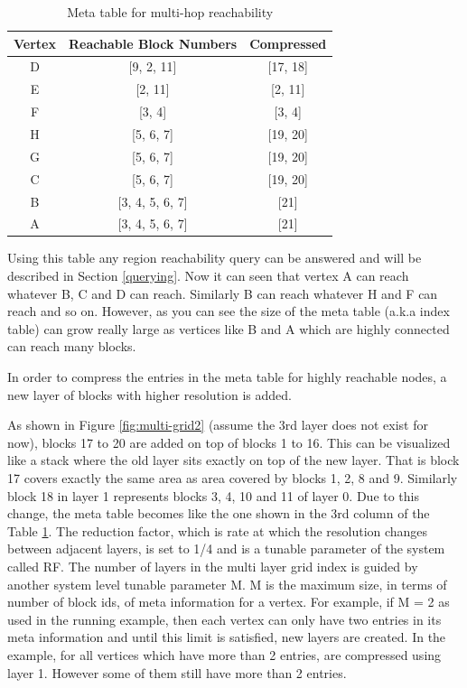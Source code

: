 \begin{table}[h]
	\caption{Meta table for multi-hop reachability}
	\small
	\label{tab:multi-hop-meta}
	\begin{center}
		\renewcommand{\arraystretch}{1.25}
		\begin{tabular}{ c | c | c }
			\hline
			Vertex & Reachable Block Numbers & Compressed\\ \hline
			\hline
			D & [9, 2, 11] & [17, 18] \\
			E & [2, 11] & [2, 11] \\
			F & [3, 4] & [3, 4] \\
			H & [5, 6, 7] & [19, 20] \\
			G & [5, 6, 7] & [19, 20] \\
			C & [5, 6, 7] & [19, 20] \\
			B & [3, 4, 5, 6, 7] & [21] \\
			A & [3, 4, 5, 6, 7] & [21] \\
			\hline
		\end{tabular}
	\end{center}
\end{table}

Using this table any region reachability query can be answered and will be described in Section \ref{querying}. Now it can seen that vertex A can reach whatever B, C and D can reach. Similarly B can reach whatever H and F can reach and so on. However, as you can see the size of the meta table (a.k.a index table) can grow really large as vertices like B and A which are highly connected can reach many blocks.

In order to compress the entries in the meta table for highly reachable nodes, a new layer of blocks with higher resolution is added.


As shown in Figure \ref{fig:multi-grid2} (assume the 3rd layer does not exist for now), blocks 17 to 20 are added on top of blocks 1 to 16. This can be visualized like a stack where the old layer sits exactly on top of the new layer. That is block 17 covers exactly the same area as area covered by blocks 1, 2, 8 and 9. Similarly block 18 in layer 1 represents blocks 3, 4, 10 and 11 of layer 0. Due to this change, the meta table becomes like the one shown in the 3rd column of the Table \ref{tab:multi-hop-meta}. The reduction factor, which is rate at which the resolution changes between adjacent layers, is set to 1/4 and is a tunable parameter of the system called RF. The number of layers in the multi layer grid index is guided by another system level tunable parameter M. M is the maximum size, in terms of number of block ids, of meta information for a vertex. For example, if M = 2 as used in the running example, then each vertex can only have two entries in its meta information and until this limit is satisfied, new layers are created. In the example, for all vertices which have more than 2 entries, are compressed using layer 1. However some of them still have more than 2 entries. 

